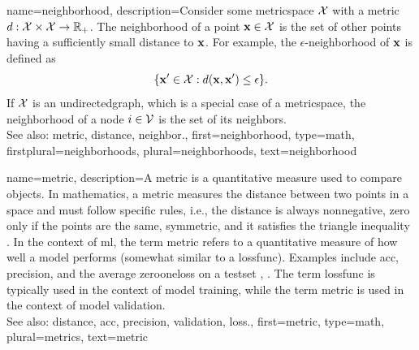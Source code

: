 {name={neighborhood},
 	description={Consider some \gls{metricspace} $\mathcal{X}$ with a \gls{metric} 
		$d: \mathcal{X} \times \mathcal{X} \rightarrow \mathbb{R}_{+}$.	
 		The neighborhood of a point ${\bf x} \in \mathcal{X}$ 
 		is the set of other points having a sufficiently small \gls{distance} to ${\bf x}$. 
 		For example, the $\epsilon$-neighborhood of ${\bf x}$ is defined as
 		$$ \{ {\bf x}' \in \mathcal{X} : d({\bf x}, {\bf x}') \leq \epsilon \}.$$
		If $\mathcal{X}$ is an \gls{undirectedgraph}, which is a special case of 
 		a \gls{metricspace}, the neighborhood of a node $i \in \mathcal{V}$ 
 		is the set of its \glspl{neighbor}.
 				\\ 
 		See also: \gls{metric}, \gls{distance}, \gls{neighbor}.},
 	first={neighborhood},
	type=math,
	firstplural={neighborhoods},
 	plural={neighborhoods},
 	text={neighborhood} 
}

{name={metric},
	description={A metric is a quantitative \gls{measure} used to compare objects. 
	     	In mathematics, a metric measures the \gls{distance} between two points in a space and must 
		follow specific rules, i.e., the \gls{distance} is always nonnegative, zero only if the 
		points are the same, symmetric, and it satisfies the triangle inequality \cite{RudinBookPrinciplesMatheAnalysis}. In the context of 
		\gls{ml}, the term metric refers to a quantitative \gls{measure} of how well a \gls{model} performs (somewhat 
		similar to a \gls{lossfunc}). Examples include \gls{acc}, \gls{precision}, and the average 
		\gls{zerooneloss} on a \gls{testset} \cite{Goodfellow-et-al-2016}, \cite{BishopBook}. 
		The term \gls{lossfunc} is typically used in the context of \gls{model} \gls{training}, 
		while the term metric is used in the context of \gls{model} \gls{validation}.
		\\ 
		See also: \gls{distance}, \gls{acc}, \gls{precision}, \gls{validation}, \gls{loss}.},
	first={metric}, 
	type=math,
	plural={metrics},
	text={metric}
}

